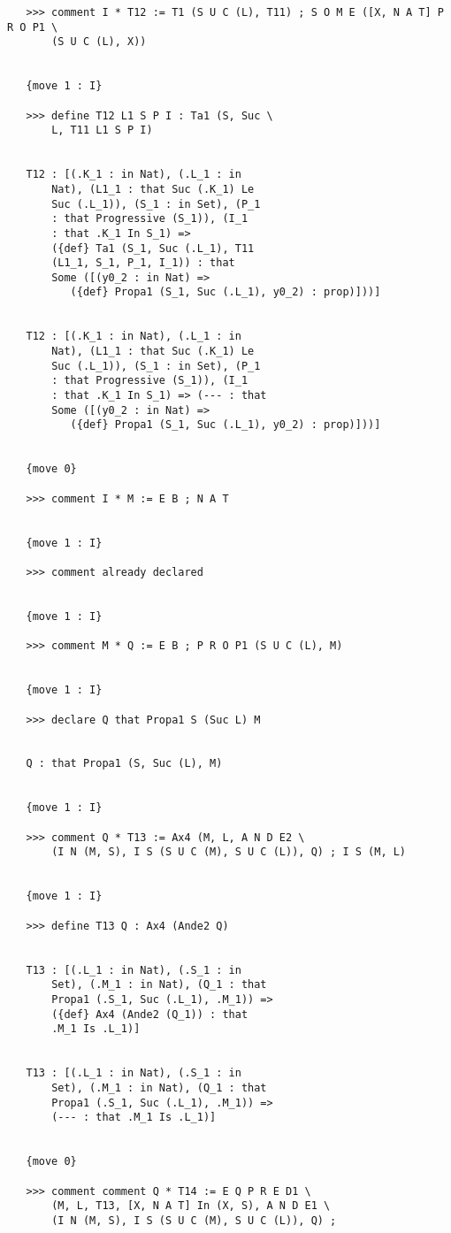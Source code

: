 \documentclass{article}
\begin{document}
\begin{verbatim}
   >>> comment I * T12 := T1 (S U C (L), T11) ; S O M E ([X, N A T] P R O P1 \
       (S U C (L), X))


   {move 1 : I}

   >>> define T12 L1 S P I : Ta1 (S, Suc \
       L, T11 L1 S P I)


   T12 : [(.K_1 : in Nat), (.L_1 : in 
       Nat), (L1_1 : that Suc (.K_1) Le 
       Suc (.L_1)), (S_1 : in Set), (P_1 
       : that Progressive (S_1)), (I_1 
       : that .K_1 In S_1) => 
       ({def} Ta1 (S_1, Suc (.L_1), T11 
       (L1_1, S_1, P_1, I_1)) : that 
       Some ([(y0_2 : in Nat) => 
          ({def} Propa1 (S_1, Suc (.L_1), y0_2) : prop)]))]


   T12 : [(.K_1 : in Nat), (.L_1 : in 
       Nat), (L1_1 : that Suc (.K_1) Le 
       Suc (.L_1)), (S_1 : in Set), (P_1 
       : that Progressive (S_1)), (I_1 
       : that .K_1 In S_1) => (--- : that 
       Some ([(y0_2 : in Nat) => 
          ({def} Propa1 (S_1, Suc (.L_1), y0_2) : prop)]))]


   {move 0}

   >>> comment I * M := E B ; N A T


   {move 1 : I}

   >>> comment already declared


   {move 1 : I}

   >>> comment M * Q := E B ; P R O P1 (S U C (L), M)


   {move 1 : I}

   >>> declare Q that Propa1 S (Suc L) M


   Q : that Propa1 (S, Suc (L), M)


   {move 1 : I}

   >>> comment Q * T13 := Ax4 (M, L, A N D E2 \
       (I N (M, S), I S (S U C (M), S U C (L)), Q) ; I S (M, L)


   {move 1 : I}

   >>> define T13 Q : Ax4 (Ande2 Q)


   T13 : [(.L_1 : in Nat), (.S_1 : in 
       Set), (.M_1 : in Nat), (Q_1 : that 
       Propa1 (.S_1, Suc (.L_1), .M_1)) => 
       ({def} Ax4 (Ande2 (Q_1)) : that 
       .M_1 Is .L_1)]


   T13 : [(.L_1 : in Nat), (.S_1 : in 
       Set), (.M_1 : in Nat), (Q_1 : that 
       Propa1 (.S_1, Suc (.L_1), .M_1)) => 
       (--- : that .M_1 Is .L_1)]


   {move 0}

   >>> comment comment Q * T14 := E Q P R E D1 \
       (M, L, T13, [X, N A T] In (X, S), A N D E1 \
       (I N (M, S), I S (S U C (M), S U C (L)), Q) ;



\end{verbatim}
\end{document}
